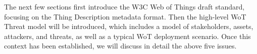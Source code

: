 The next few sections first introduce the W3C Web of Things draft standard,
focusing on the Thing Description metadata format.  
Then the high-level WoT Threat model will be introduced,
which includes a model of stakeholders, assets, attackers,
and threats, as well as a typical WoT deployment scenario.
Once this context has been established, we will discuss in detail the above
five issues.

